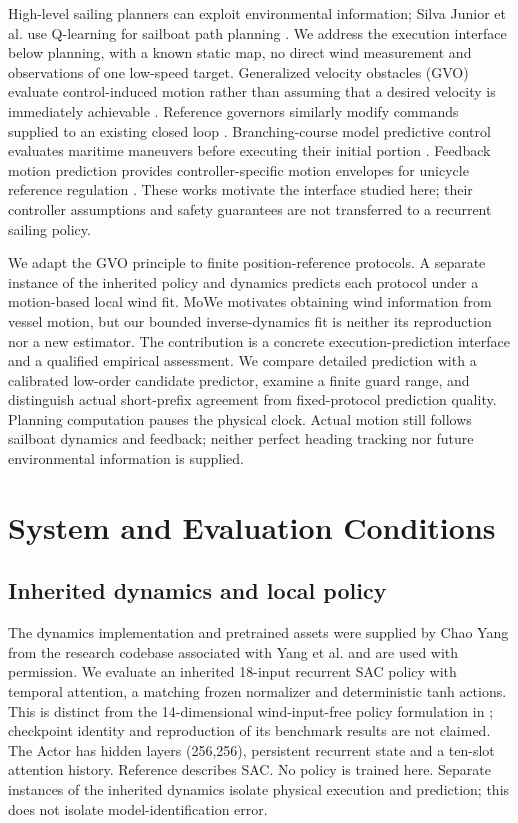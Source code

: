 \documentclass[conference]{IEEEtran}
\begin{document}
High-level sailing planners can exploit environmental information; Silva Junior et al. use Q-learning for sailboat path planning \cite{ref1}. We address the execution interface below planning, with a known static map, no direct wind measurement and observations of one low-speed target. Generalized velocity obstacles (GVO) evaluate control-induced motion rather than assuming that a desired velocity is immediately achievable \cite{ref2}. Reference governors similarly modify commands supplied to an existing closed loop \cite{ref3}. Branching-course model predictive control evaluates maritime maneuvers before executing their initial portion \cite{ref6}. Feedback motion prediction provides controller-specific motion envelopes for unicycle reference regulation \cite{ref7}. These works motivate the interface studied here; their controller assumptions and safety guarantees are not transferred to a recurrent sailing policy.

We adapt the GVO principle to finite position-reference protocols. A separate instance of the inherited policy and dynamics predicts each protocol under a motion-based local wind fit. MoWe \cite{ref4} motivates obtaining wind information from vessel motion, but our bounded inverse-dynamics fit is neither its reproduction nor a new estimator. The contribution is a concrete execution-prediction interface and a qualified empirical assessment. We compare detailed prediction with a calibrated low-order candidate predictor, examine a finite guard range, and distinguish actual short-prefix agreement from fixed-protocol prediction quality. Planning computation pauses the physical clock. Actual motion still follows sailboat dynamics and feedback; neither perfect heading tracking nor future environmental information is supplied.

\section{System and Evaluation Conditions}

\subsection{Inherited dynamics and local policy}

The dynamics implementation and pretrained assets were supplied by Chao Yang from the research codebase associated with Yang et al. \cite{ref9} and are used with permission. We evaluate an inherited 18-input recurrent SAC policy with temporal attention, a matching frozen normalizer and deterministic tanh actions. This is distinct from the 14-dimensional wind-input-free policy formulation in \cite{ref9}; checkpoint identity and reproduction of its benchmark results are not claimed. The Actor has hidden layers (256,256), persistent recurrent state and a ten-slot attention history. Reference \cite{ref5} describes SAC. No policy is trained here. Separate instances of the inherited dynamics isolate physical execution and prediction; this does not isolate model-identification error.
\end{document}
